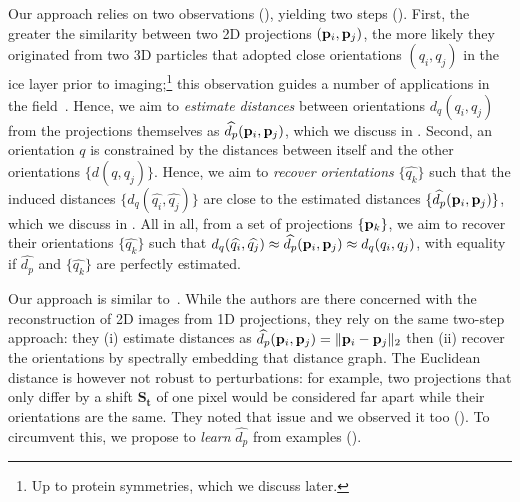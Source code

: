 Our approach relies on two observations (), yielding two steps ().
First, the greater the similarity between two 2D projections $(\mathbf{p}_i, \mathbf{p}_j)$, the more likely they originated from two 3D particles that adopted close orientations $(q_i, q_j)$ in the ice layer prior to imaging;\footnote{Up to protein symmetries, which we discuss later.} this observation guides a number of applications in the field~\cite{frank2006three}.
Hence, we aim to \textit{estimate distances} between orientations $d_q(q_i, q_j)$ from the projections themselves as $\widehat{d_p}(\mathbf{p}_i, \mathbf{p}_j)$, which we discuss in .
Second, an orientation $q$ is constrained by the distances between itself and the other orientations $\{ d(q, q_j) \}$.
Hence, we aim to \textit{recover orientations} $\{\widehat{q_k}\}$ such that the induced distances $\{ d_q(\widehat{q_i}, \widehat{q_j}) \}$ are close to the estimated distances $\{ \widehat{d_p}(\mathbf{p}_i, \mathbf{p}_j) \}$, which we discuss in .
All in all, from a set of projections $\{\mathbf{p}_k\}$, we aim to recover their orientations $\{\widehat{q_k}\}$ such that $d_q(\widehat{q_i}, \widehat{q_j}) \approx \widehat{d_p}(\mathbf{p}_i, \mathbf{p}_j) \approx d_q(q_i, q_j)$, with equality if $\widehat{d_p}$ and $\{\widehat{q_k}\}$ are perfectly estimated.

Our approach is similar to~\cite{coifman2008graphprojections}.
While the authors are there concerned with the reconstruction of 2D images from 1D projections, they rely on the same two-step approach: they (i) estimate distances as $\widehat{d_p}(\mathbf{p}_i, \mathbf{p}_j) = \| \mathbf{p}_i - \mathbf{p}_j \|_2$ then (ii) recover the orientations by spectrally embedding that distance graph.
The Euclidean distance is however not robust to perturbations:
for example, two projections that only differ by a shift $\mathbf{S_t}$ of one pixel would be considered far apart while their orientations are the same.
They noted that issue and we observed it too (). To circumvent this, we propose to \textit{learn} $\widehat{d_p}$ from examples ().

